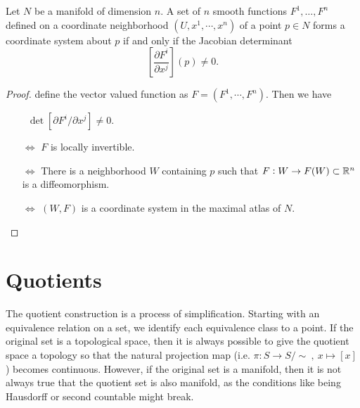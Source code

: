 \begin{corollary}
	\label{cor:MapsAsLocalCoordinateSystems}
	Let $ N $ be a manifold of dimension $ n $. A set of $ n $ smooth functions $ F^1,\dots,F^n $ defined on a coordinate neighborhood $ (U,x^1,\cdots,x^n) $ of a point $ p \in N $ forms a coordinate system about $ p $ if and only if the Jacobian determinant 
	\[ \left[  \frac{\partial F^i}{\partial x^j}  \right](p) \neq 0. \]
\end{corollary}



\begin{proof}
	define the vector valued function as $ F = (F^1,\cdots,F^n) $. Then we have
	\begin{itemize}
		\item[$\,$] $ \det[\partial F^i/\partial x^j] \neq 0 $.
		\item[$\Longleftrightarrow$] $ F $ is locally invertible.
		\item[$\Longleftrightarrow$] There is a neighborhood $ W $ containing $ p $ such that $ F:W \to F(W) \subset \mathbb{R}^n $ is a diffeomorphism.
		\item[$\Longleftrightarrow$] $ (W,F) $ is a coordinate system in the maximal atlas of $ N $.
	\end{itemize}
\end{proof}




\section{Quotients}
The quotient construction is a process of simplification. Starting with an equivalence relation on a set, we identify each equivalence class to a point. If the original set is a topological space, then it is always possible to give the quotient space a topology so that the natural projection map (i.e. $ \pi: S\to S/\sim\ ,\ x\mapsto [x] $) becomes continuous. However, if the original set is a manifold, then it is not always true that the quotient set is also manifold, as the conditions like being Hausdorff or second countable might break.

